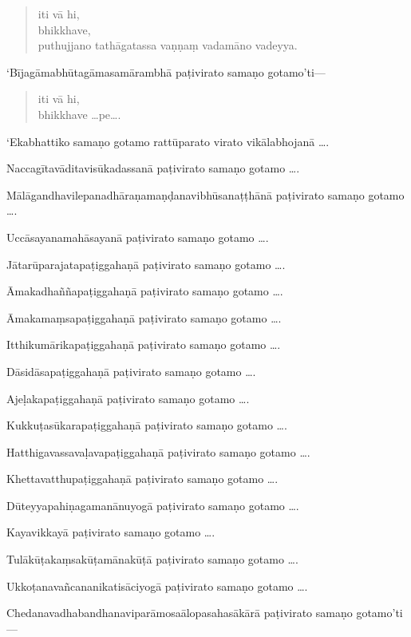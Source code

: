 \documentclass[11pt,twoside,openright]{book}
\begin{document}
\begin{verse}
iti vā hi,\\
\vin  bhikkhave,\\
\vin  puthujjano tathāgatassa vaṇṇaṃ vadamāno vadeyya.

\end{verse}
\pstart
‘Bījagāmabhūtagāmasamārambhā paṭivirato samaṇo gotamo’ti—
\pend

\begin{verse}
iti vā hi,\\
\vin  bhikkhave …pe….

\end{verse}
\pstart
‘Ekabhattiko samaṇo gotamo rattūparato virato vikālabhojanā ….
\pend

\pstart
Naccagītavāditavisūkadassanā paṭivirato samaṇo gotamo ….
\pend

\pstart
Mālāgandhavilepanadhāraṇamaṇḍanavibhūsanaṭṭhānā paṭivirato samaṇo gotamo ….
\pend

\pstart
Uccāsayanamahāsayanā paṭivirato samaṇo gotamo ….
\pend

\pstart
Jātarūparajatapaṭiggahaṇā paṭivirato samaṇo gotamo ….
\pend

\pstart
Āmakadhaññapaṭiggahaṇā paṭivirato samaṇo gotamo ….
\pend

\pstart
Āmakamaṃsapaṭiggahaṇā paṭivirato samaṇo gotamo ….
\pend

\pstart
Itthikumārikapaṭiggahaṇā paṭivirato samaṇo gotamo ….
\pend

\pstart
Dāsidāsapaṭiggahaṇā paṭivirato samaṇo gotamo ….
\pend

\pstart
Ajeḷakapaṭiggahaṇā paṭivirato samaṇo gotamo ….
\pend

\pstart
Kukkuṭasūkarapaṭiggahaṇā paṭivirato samaṇo gotamo ….
\pend

\pstart
Hatthigavassavaḷavapaṭiggahaṇā paṭivirato samaṇo gotamo ….
\pend

\pstart
Khettavatthupaṭiggahaṇā paṭivirato samaṇo gotamo ….
\pend

\pstart
Dūteyyapahiṇagamanānuyogā paṭivirato samaṇo gotamo ….
\pend

\pstart
Kayavikkayā paṭivirato samaṇo gotamo ….
\pend

\pstart
Tulākūṭakaṃsakūṭamānakūṭā paṭivirato samaṇo gotamo ….
\pend

\pstart
Ukkoṭanavañcananikatisāciyogā paṭivirato samaṇo gotamo ….
\pend

\pstart
Chedanavadhabandhanaviparāmosaālopasahasākārā paṭivirato samaṇo gotamo’ti—
\pend
\end{document}
